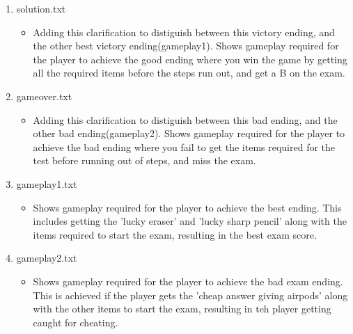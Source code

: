 \documentclass[11pt]{article}
\begin{document}
\begin{enumerate}

\item solution.txt
\begin{itemize}
\item Adding this clarification to distiguish between this victory ending, and the other best victory ending(gameplay1). Shows gameplay required for the player to achieve the good ending where you win the game by getting all the required items before the steps run out, and get a B on the exam.
\end{itemize}

\item gameover.txt
\begin{itemize}
\item Adding this clarification to distiguish between this bad ending, and the other bad ending(gameplay2). Shows gameplay required for the player to achieve the bad ending where you fail to get the items required for the test before running out of steps, and miss the exam.
\end{itemize}

\item gameplay1.txt
	\begin{itemize}
	\item Shows gameplay required for the player to achieve the best ending. This includes getting the 'lucky eraser' and 'lucky sharp pencil' along with the items required to start the exam, resulting in the best exam score.
	\end{itemize}

\item gameplay2.txt
	\begin{itemize}
	\item Shows gameplay required for the player to achieve the bad exam ending. This is achieved if the player gets the 'cheap answer giving airpods' along with the other items to start the exam, resulting in teh player getting caught for cheating. 
	\end{itemize}

\end{enumerate}
\end{document}
